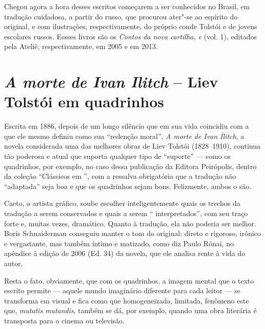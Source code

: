 Chegou agora a hora desses escritos começarem a ser conhecidos no Brasil,
em tradução cuidadosa, a partir do russo, que procurou ater"-se ao
espírito do original, e com ilustrações, respectivamente, do próprio
conde Tolstói e de jovens escolares russos. Essses livros são os
\emph{Contos da nova cartilha,  e } (vol. 1), editados pela Ateliê,
respectivamente, em 2005 e em 2013.



\chapter{\emph{A morte de Ivan Ilitch} -- Liev Tolstói em quadrinhos}

Escrita em 1886, depois de um longo silêncio que em sua vida coincidiu
com a que ele mesmo definiu como sua ``redenção moral'', \emph{A morte
de Ivan Ilitch}, a novela considerada uma das melhores obras de Liev
Tolstói (1828--1910), continua tão poderosa e atual que suporta qualquer
tipo de ``suporte'' --- como os quadrinhos, por exemplo, no caso dessa
publicação da Editora Peirópolis, dentro da coleção ``Clássicos em
'', com a ressalva obrigatória que a tradução não ``adaptada'' seja
boa e que os quadrinhos sejam bons. Felizmente, ambos o são.

Caeto, o artista gráfico, soube escolher inteligentemente quais os
trechos da tradução a serem conservados e quais a serem ``
interpretados'', com seu traço forte e, muitas vezes, dramático. Quanto
à tradução, ela não poderia ser melhor. Boris Schnaiderman conseguiu
manter o tom do original: direto e rigoroso, irônico e vergastante, mas
também íntimo e matizado, como diz Paulo Rónai, no apêndice à edição de
2006 (Ed. 34) da novela, que ele analisa rente à vida do autor.

Resta o fato, obviamente, que com os quadrinhos, a imagem mental que o
texto escrito permite --- aquele mundo imaginário diferente para cada
leitor --- se transforma em visual e fica como que homogeneizada,
limitada, fenômeno este que, \emph{mutatis mutandis}, também se dá, por
exemplo, quando uma obra literária é transposta para o cinema ou televisão.

